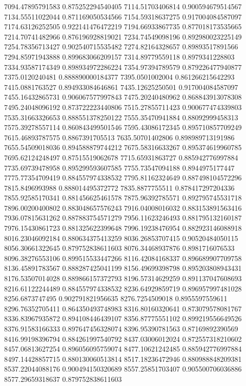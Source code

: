 {7094.47895791583 0.875252294540405
7114.51703406814 0.900594679514567
7134.55511022044 0.871169050534566
7154.59318637275 0.917004084587097
7174.63126252505 0.922141476472219
7194.66933867735 0.877018173535665
7214.70741482966 0.876196928819021
7234.74549098196 0.892980023225149
7254.78356713427 0.902540715535482
7274.82164328657 0.89893517891566
7294.85971943888 0.899683066209157
7314.89779559118 0.8979341228803
7334.93587174349 0.898934972286224
7354.97394789579 0.879226477940877
7375.0120240481 0.888890000184377
7395.0501002004 0.861266215642293
7415.0881763527 0.894933084646861
7435.12625250501 0.917004084587097
7455.16432865731 0.906067577997843
7475.20240480962 0.868843913078308
7495.24048096192 0.873722223440806
7515.27855711423 0.900677474339803
7535.31663326653 0.888551378250122
7555.35470941884 0.88092999458313
7575.39278557114 0.860843499501546
7595.43086172345 0.895710857709249
7615.46893787575 0.8867391705513
7635.50701402806 0.898989713191986
7655.54509018036 0.894588879744212
7675.58316633267 0.895374619960785
7695.62124248497 0.87515519062678
7715.65931863727 0.885942776997884
7735.69739478958 0.895299593607585
7755.73547094188 0.8944975177447
7775.77354709419 0.884557974338532
7795.81162324649 0.887498104572296
7815.8496993988 0.888014495372772
7835.8877755511 0.878417297204336
7855.92585170341 0.881456625461578
7875.96392785571 0.892795745531718
7896.00200400802 0.883048657576243
7916.04008016032 0.883153891563416
7936.07815631262 0.887883754571279
7956.11623246493 0.881795132160187
7976.15430861723 0.881325622399648
7996.19238476954 0.882923146088918
8016.23046092184 0.880634375413259
8036.26853707415 0.90520484050115
8056.30661322645 0.879752838611603
8076.34468937876 0.8981716076533
8096.38276553106 0.899515533447266
8116.42084168337 0.896689907709758
8136.45891783567 0.888287425041199
8156.49699398798 0.895203808943431
8176.53507014028 0.889866157372793
8196.57314629259 0.891137047608693
8216.61122244489 0.884557974338532
8236.64929859719 0.896957997481028
8256.6873747495 0.902791821956635
8276.7254509018 0.8955597559611
8296.76352705411 0.864350493748983
8316.80160320641 0.873079578081767
8336.83967935872 0.894108446439107
8356.87775551102 0.899219556649526
8376.91583166333 0.897647456328074
8396.95390781563 0.87169892390569
8416.99198396794 0.884261997540792
8437.03006012024 0.872557318210602
8457.06813627254 0.896056095759074
8477.10621242485 0.885942776997884
8497.14428857715 0.880130060513814
8517.18236472946 0.880988848209381
8537.22044088176 0.900494150320689
8557.25851703407 0.905500706036886
8577.29659318637 0.879752838611603
}
